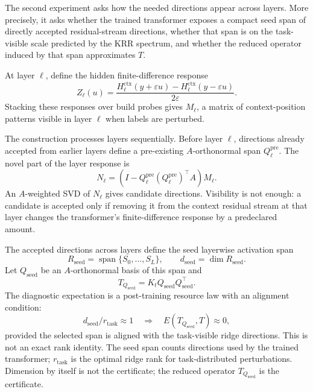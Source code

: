 \documentclass[11pt]{article}
\newcommand{\spanop}{\operatorname{span}}
\begin{document}
The second experiment asks how the needed directions appear across layers. More precisely, it asks
whether the trained transformer exposes a compact seed span of directly accepted residual-stream
directions, whether that span is on the task-visible scale predicted by the KRR spectrum, and whether
the reduced operator induced by that span approximates \(T\).

At layer \(\ell\), define the hidden finite-difference response
\[
Z_\ell(u)=
\frac{
H_\ell^{\mathrm{ctx}}(y+\varepsilon u)-H_\ell^{\mathrm{ctx}}(y-\varepsilon u)
}{2\varepsilon}.
\]
Stacking these responses over build probes gives \(M_\ell\), a matrix of context-position patterns
visible in layer \(\ell\) when labels are perturbed.

The construction processes layers sequentially. Before layer \(\ell\), directions already accepted
from earlier layers define a pre-existing \(A\)-orthonormal span \(Q_\ell^{\mathrm{pre}}\). The novel
part of the layer response is
\[
N_\ell
=
\left(I-Q_\ell^{\mathrm{pre}}(Q_\ell^{\mathrm{pre}})^\top A\right)M_\ell.
\]
An \(A\)-weighted SVD of \(N_\ell\) gives candidate directions. Visibility is not enough: a candidate
is accepted only if removing it from the context residual stream at that layer changes the
transformer's finite-difference response by a predeclared amount.

The accepted directions across layers define the seed layerwise activation span
\[
R_{\mathrm{seed}}=\spanop\{S_0,\ldots,S_L\},
\qquad
d_{\mathrm{seed}}=\dim R_{\mathrm{seed}}.
\]
Let \(Q_{\mathrm{seed}}\) be an \(A\)-orthonormal basis of this span and
\[
T_{Q_{\mathrm{seed}}}=K_tQ_{\mathrm{seed}}Q_{\mathrm{seed}}^\top.
\]
The diagnostic expectation is a post-training resource law with an alignment condition:
\[
d_{\mathrm{seed}}/r_{\mathrm{task}}\approx1
\quad\Longrightarrow\quad
E(T_{Q_{\mathrm{seed}}},T)\approx0,
\]
provided the selected span is aligned with the task-visible ridge directions. This is not an exact
rank identity. The seed span counts directions used by the trained transformer; \(r_{\mathrm{task}}\)
is the optimal ridge rank for task-distributed perturbations. Dimension by itself is not the
certificate; the reduced operator \(T_{Q_{\mathrm{seed}}}\) is the certificate.
\end{document}
